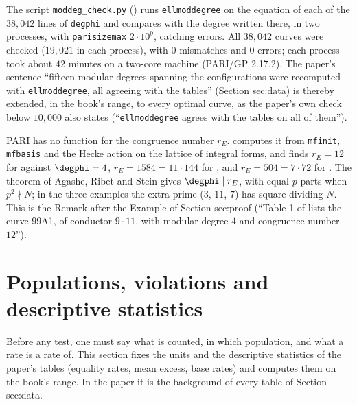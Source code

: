 \begin{sloppypar}
\begin{example}\label{ex:computation:moddeg-check}
The script \texttt{moddeg\_check.py} () runs \texttt{ellmoddegree} on the equation of each of the $38{,}042$
lines of \texttt{degphi} and compares with the degree written there, in two processes, with \texttt{parisizemax} $2\cdot10^9$, catching errors.
All $38{,}042$ curves were checked ($19{,}021$ in each process), with $0$ mismatches and $0$ errors; each process took about $42$ minutes on a
two-core machine (PARI/GP 2.17.2).
The paper's sentence ``fifteen modular degrees spanning the configurations were recomputed with \texttt{ellmoddegree}, all agreeing with the
tables'' (Section sec:data) is thereby extended, in the book's range, to every optimal curve, as the paper's own check below $10{,}000$ also
states (``\texttt{ellmoddegree} agrees with the tables on all of them'').
\end{example}

\begin{remark}\label{rem:computation:congruence-number}
PARI has no function for the congruence number $r_E$.  computes it from \texttt{mfinit}, \texttt{mfbasis} and the Hecke action on
the lattice of integral forms, and finds $r_E=12$ for  against $\degphi=4$, $r_E=1584=11\cdot144$ for , and $r_E=504=7\cdot72$ for
. The theorem of Agashe, Ribet and Stein \cite[Theorem 2.2]{ARS12} gives $\degphi\mid r_E$, with equal $p$-parts when $p^2\nmid N$; in the
three examples the extra prime ($3$, $11$, $7$) has square dividing $N$. This is the Remark after the Example of Section sec:proof (``Table 1 of
\cite{ARS12} lists the curve 99A1, of conductor $9\cdot11$, with modular degree $4$ and congruence number $12$'').
\end{remark}

\section{Populations, violations and descriptive statistics}\label{sec:computation:populations}

Before any test, one must say what is counted, in which population, and what a rate is a rate of. This section fixes the units and the
descriptive statistics of the paper's tables (equality rates, mean excess, base rates) and computes them on the book's range. In the paper it
is the background of every table of Section sec:data.


\end{sloppypar}
